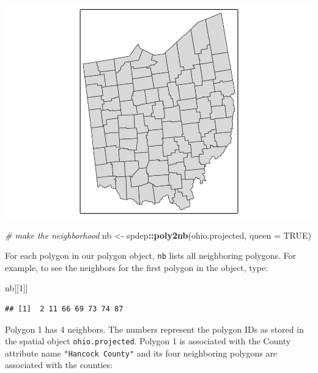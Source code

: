 \documentclass[]{article}
\newenvironment{Shaded}{\begin{snugshade}}{\end{snugshade}}
\newcommand{\AttributeTok}[1]{\textcolor[rgb]{0.13,0.29,0.53}{#1}}
\newcommand{\CommentTok}[1]{\textcolor[rgb]{0.56,0.35,0.01}{\textit{#1}}}
\newcommand{\ConstantTok}[1]{\textcolor[rgb]{0.56,0.35,0.01}{#1}}
\newcommand{\DecValTok}[1]{\textcolor[rgb]{0.00,0.00,0.81}{#1}}
\newcommand{\FunctionTok}[1]{\textcolor[rgb]{0.13,0.29,0.53}{\textbf{#1}}}
\newcommand{\NormalTok}[1]{#1}
\newcommand{\OtherTok}[1]{\textcolor[rgb]{0.56,0.35,0.01}{#1}}
\newcommand{\SpecialCharTok}[1]{\textcolor[rgb]{0.81,0.36,0.00}{\textbf{#1}}}
\begin{document}
\includegraphics{lab03_files/figure-latex/make some neighbors-1.pdf}

\begin{Shaded}
\begin{Highlighting}[]
\CommentTok{\# make the neighborhood}
\NormalTok{nb }\OtherTok{\textless{}{-}}\NormalTok{ spdep}\SpecialCharTok{::}\FunctionTok{poly2nb}\NormalTok{(ohio.projected, }\AttributeTok{queen =} \ConstantTok{TRUE}\NormalTok{)}
\end{Highlighting}
\end{Shaded}

For each polygon in our polygon object, \texttt{nb} lists all
neighboring polygons. For example, to see the neighbors for the first
polygon in the object, type:

\begin{Shaded}
\begin{Highlighting}[]
\NormalTok{nb[[}\DecValTok{1}\NormalTok{]]}
\end{Highlighting}
\end{Shaded}

\begin{verbatim}
## [1]  2 11 66 69 73 74 87
\end{verbatim}

Polygon 1 has 4 neighbors. The numbers represent the polygon IDs as
stored in the spatial object \texttt{ohio.projected}. Polygon 1 is
associated with the County attribute name \texttt{"Hancock\ County"} and
its four neighboring polygons are associated with the counties:

\begin{Shaded}
\end{Shaded}
\end{document}
